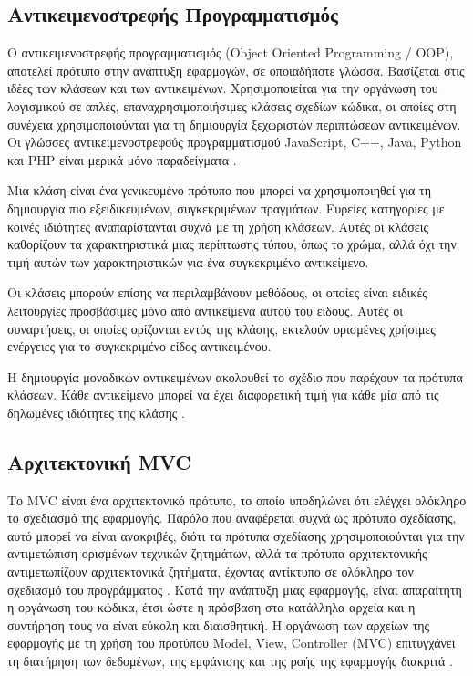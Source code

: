 \subsection{Αντικειμενοστρεφής Προγραμματισμός}
Ο αντικειμενοστρεφής προγραμματισμός (Object Oriented Programming / OOP), αποτελεί πρότυπο στην ανάπτυξη εφαρμογών, σε οποιαδήποτε γλώσσα. Βασίζεται στις ιδέες των κλάσεων και των αντικειμένων. Χρησιμοποιείται για την οργάνωση του λογισμικού σε απλές, επαναχρησιμοποιήσιμες κλάσεις σχεδίων κώδικα, οι οποίες στη συνέχεια χρησιμοποιούνται για τη δημιουργία ξεχωριστών περιπτώσεων αντικειμένων. Οι γλώσσες αντικειμενοστρεφούς προγραμματισμού JavaScript, C++, Java, Python και PHP είναι μερικά μόνο παραδείγματα \cite{smith2011object}.

Μια κλάση είναι ένα γενικευμένο πρότυπο που μπορεί να χρησιμοποιηθεί για τη δημιουργία πιο εξειδικευμένων, συγκεκριμένων πραγμάτων. Ευρείες κατηγορίες με κοινές ιδιότητες αναπαρίστανται συχνά με τη χρήση κλάσεων. Αυτές οι κλάσεις καθορίζουν τα χαρακτηριστικά μιας περίπτωσης τύπου, όπως το χρώμα, αλλά όχι την τιμή αυτών των χαρακτηριστικών για ένα συγκεκριμένο αντικείμενο.

Οι κλάσεις μπορούν επίσης να περιλαμβάνουν μεθόδους, οι οποίες είναι ειδικές λειτουργίες προσβάσιμες μόνο από αντικείμενα αυτού του είδους. Αυτές οι συναρτήσεις, οι οποίες ορίζονται εντός της κλάσης, εκτελούν ορισμένες χρήσιμες ενέργειες για το συγκεκριμένο είδος αντικειμένου.

Η δημιουργία μοναδικών αντικειμένων ακολουθεί το σχέδιο που παρέχουν τα πρότυπα κλάσεων. Κάθε αντικείμενο μπορεί να έχει διαφορετική τιμή για κάθε μία από τις δηλωμένες ιδιότητες της κλάσης \cite{Doherty_2020}.

\subsection{Αρχιτεκτονική MVC}
Το MVC είναι ένα αρχιτεκτονικό πρότυπο, το οποίο υποδηλώνει ότι ελέγχει ολόκληρο το σχεδιασμό της εφαρμογής. Παρόλο που αναφέρεται συχνά ως πρότυπο σχεδίασης, αυτό μπορεί να είναι ανακριβές, διότι τα πρότυπα σχεδίασης χρησιμοποιούνται για την αντιμετώπιση ορισμένων τεχνικών ζητημάτων, αλλά τα πρότυπα αρχιτεκτονικής αντιμετωπίζουν αρχιτεκτονικά ζητήματα, έχοντας αντίκτυπο σε ολόκληρο τον σχεδιασμό του προγράμματος \cite{Svirca_2020}. Κατά την ανάπτυξη μιας εφαρμογής, είναι απαραίτητη η οργάνωση του κώδικα, έτσι ώστε η πρόσβαση στα κατάλληλα αρχεία και η συντήρηση τους να είναι εύκολη και διαισθητική. Η οργάνωση των αρχείων της εφαρμογής με τη χρήση του προτύπου Model, View, Controller (MVC) επιτυγχάνει τη διατήρηση των δεδομένων, της εμφάνισης και της ροής της εφαρμογής διακριτά \cite{CodeIgniter_mvc}.

